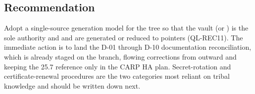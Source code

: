 \subsection{Recommendation}

Adopt a single-source generation model for the  tree so that the vault (or ) is the sole authority and  and  are generated or reduced to pointers (QL-REC11). The immediate action is to land the D-01 through D-10 documentation reconciliation, which is already staged on the  branch, flowing corrections from  outward and keeping the 25.7 reference only in the CARP HA plan. Secret-rotation and certificate-renewal procedures are the two categories most reliant on tribal knowledge and should be written down next.
